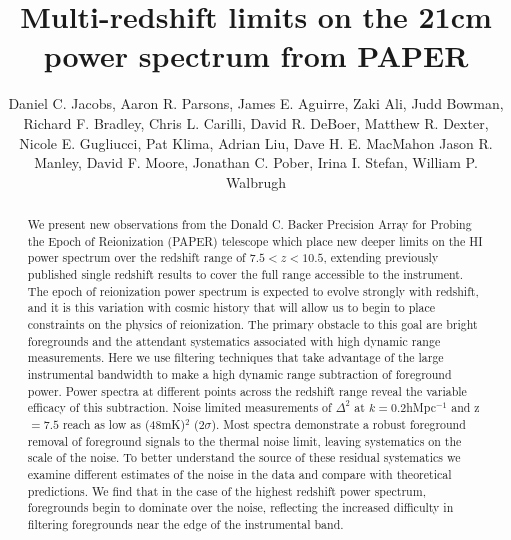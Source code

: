 \documentclass[preprint]{aastex}
\begin{document}
\title{Multi-redshift limits on the 21cm power spectrum from PAPER}
\author{
Daniel C. Jacobs,
Aaron R. Parsons,
James E. Aguirre,
Zaki Ali,
Judd Bowman,
Richard F. Bradley,
Chris L.  Carilli,
David R. DeBoer,
Matthew R. Dexter,
Nicole E. Gugliucci,
Pat Klima,
Adrian Liu,
Dave H. E. MacMahon
Jason R. Manley,
David F. Moore,
Jonathan C. Pober,
Irina I. Stefan,
William P. Walbrugh}


\begin{abstract}
We present new observations from the Donald C. Backer Precision Array for Probing the Epoch of Reionization (PAPER) telescope which place new deeper limits on the HI power spectrum over the redshift range of $7.5<z<10.5$, extending previously published single redshift results to cover the full range accessible to the instrument. The epoch of reionization power spectrum is expected to evolve strongly with redshift, and it is this variation with cosmic history that will allow us to begin to place constraints on the physics of reionization.  The primary obstacle to this goal are bright foregrounds and the attendant systematics associated with high dynamic range measurements. Here we use filtering techniques that take advantage of the large instrumental bandwidth to make a high dynamic range subtraction of foreground power.  Power spectra at different points across the redshift range reveal the variable efficacy of this subtraction.  Noise limited measurements of $\Delta^2$ at $k=$0.2hMpc$^{-1}$ and z$=7.5$ reach as low as (48mK)$^2$ ($2\sigma$).  Most spectra demonstrate a robust foreground removal of foreground signals to the thermal noise limit, leaving systematics on the scale of the noise. To better understand the source of these residual systematics we examine different estimates of the noise in the data and compare with theoretical predictions. We find that in the case of the highest redshift power spectrum, foregrounds begin to dominate over the noise, reflecting the increased difficulty in filtering foregrounds near the edge of the instrumental band.
\end{abstract}
\end{document}
